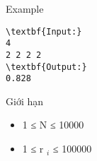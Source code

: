 Example
\begin{verbatim}
\textbf{Input:}
4
2 2 2 2
\textbf{Output:}
0.828
\end{verbatim}
Giới hạn
\begin{itemize}
	\item     1 ≤ N ≤ 10000   
	\item     1 ≤ r    $_     i    $    ≤ 100000   
\end{itemize}